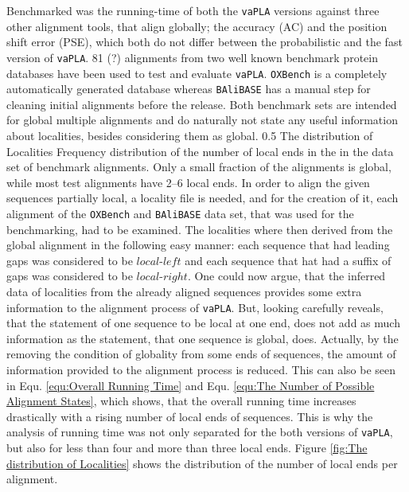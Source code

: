 \documentclass[a4paper,10pt]{thesis}
\newcommand{\software}{\texttt{vaPLA}}
\newcommand{\lL}{$local\texttt{-}left$}
\newcommand{\lR}{$local\texttt{-}right$}
\begin{document}
{{    \gapSmall
    Benchmarked was the running-time of both the \software{} versions against three other alignment tools, that align globally; the accuracy (AC) and the position shift error (PSE), which both do not differ between the probabilistic and the fast version of \software{}.
    81 (?) alignments from two well known benchmark protein databases have been used to test and evaluate \software{}. \texttt{OXBench}   is a completely automatically generated database whereas \texttt{BAliBASE}  has a manual step for cleaning initial alignments before the release. Both benchmark sets are intended for global multiple alignments and do naturally not state any useful information about localities, besides considering them as global. 
    {0.5\textwidth}
    {The distribution of Localities}
    {Frequency distribution of the number of local ends in the in the data set of benchmark alignments. Only a small fraction of the alignments is global, while most test alignments have 2--6 local ends.}%
    In order to align the given sequences partially local, a locality file is needed, and for the creation of it, each alignment of the \texttt{OXBench} and \texttt{BAliBASE} data set, that was used for the benchmarking, had to be examined. The localities where then derived from the global alignment in the following easy manner: each sequence that had leading gaps was considered to be \lL{} and each sequence that hat had a suffix of gaps was considered to be \lR{}. 
    \gapSmall
    One could now argue, that the inferred data of localities from the already aligned sequences provides some extra information to the alignment process of \software{}. But, looking carefully reveals, that the statement of one sequence to be local at one end, does not add as much information as the statement, that one sequence is global, does. Actually, by the removing the condition of globality from some ends of sequences, the amount of information provided to the alignment process is reduced. This can also be seen in Equ. \ref{equ:Overall Running Time} and Equ. \ref{equ:The Number of Possible Alignment States}, which shows, that the overall running time increases drastically with a rising number of local ends of sequences. This is why the analysis of running time was not only separated for the both versions of \software{}, but also for less than four and more than three local ends. Figure \ref{fig:The distribution of Localities} shows the distribution of the number of local ends per alignment.
    \gapSmall
}}
\end{document}
